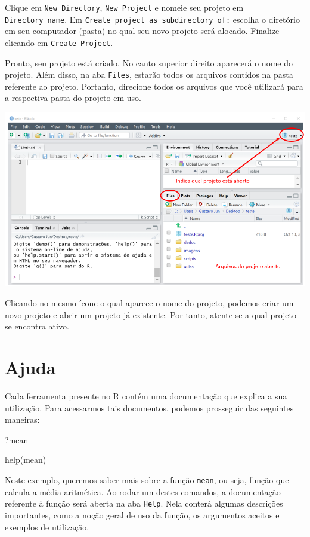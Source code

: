 \documentclass[
  brazilian,
]{book}
\newenvironment{Shaded}{\begin{snugshade}}{\end{snugshade}}
\newcommand{\FunctionTok}[1]{\textcolor[rgb]{0.00,0.00,0.00}{#1}}
\newcommand{\NormalTok}[1]{#1}
\begin{document}
Clique em \texttt{New\ Directory}, \texttt{New\ Project} e nomeie seu projeto em \texttt{Directory\ name}. Em \texttt{Create\ project\ as\ subdirectory\ of:} escolha o diretório em seu computador (pasta) no qual seu novo projeto será alocado. Finalize clicando em \texttt{Create\ Project}.

Pronto, seu projeto está criado. No canto superior direito aparecerá o nome do projeto. Além disso, na aba \texttt{Files}, estarão todos os arquivos contidos na pasta referente ao projeto. Portanto, direcione todos os arquivos que você utilizará para a respectiva pasta do projeto em uso.

\begin{center}\includegraphics[width=0.8\linewidth]{imagens/projeto_aberto} \end{center}

Clicando no mesmo ícone o qual aparece o nome do projeto, podemos criar um novo projeto e abrir um projeto já existente. Por tanto, atente-se a qual projeto se encontra ativo.

\hypertarget{ajuda}{%
\section{Ajuda}\label{ajuda}}

Cada ferramenta presente no R contém uma documentação que explica a sua utilização. Para acessarmos tais documentos, podemos prosseguir das seguintes maneiras:

\begin{Shaded}
\begin{Highlighting}[]
\NormalTok{?mean}

\FunctionTok{help}\NormalTok{(mean)}
\end{Highlighting}
\end{Shaded}

Neste exemplo, queremos saber mais sobre a função \texttt{mean}, ou seja, função que calcula a média aritmética. Ao rodar um destes comandos, a documentação referente à função será aberta na aba \texttt{Help}. Nela conterá algumas descrições importantes, como a noção geral de uso da função, os argumentos aceitos e exemplos de utilização.
\end{document}
